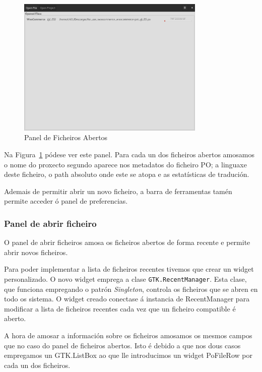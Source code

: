 \begin{figure}[h!]
    \centering
    \includegraphics[width=0.8\textwidth]{img/panel_ficheiros_abertos.png}
    \caption{Panel de Ficheiros Abertos}
    \label{fig:ui:panel:openedfiles}
\end{figure}

Na Figura~\ref{fig:ui:panel:openedfiles} pódese ver este panel. Para cada un dos ficheiros abertos amosamos o nome do proxecto segundo aparece nos metadatos do ficheiro PO; a linguaxe deste ficheiro, o path absoluto onde este se atopa e as estatísticas de tradución.

Ademais de permitir abrir un novo ficheiro, a barra de ferramentas tamén permite acceder ó panel de preferencias.

\subsubsection{Panel de abrir ficheiro}

O panel de abrir ficheiros amosa os ficheiros abertos de forma recente e permite abrir novos ficheiros.

Para poder implementar a lista de ficheiros recentes tivemos que crear un widget personalizado. O novo widget emprega a clase \lstinline{GTK.RecentManager}. Esta clase, que funciona empregando o patrón \emph{Singleton}\cite{book:gang4pat}, controla os ficheiros que se abren en todo os sistema. O widget creado conectase á instancia de RecentManager para modificar a lista de ficheiros recentes cada vez que un ficheiro compatible é aberto.

A hora de amosar a información sobre os ficheiros amosamos os mesmos campos que no caso do panel de ficheiros abertos. Isto é debido a que nos dous casos empregamos un GTK.ListBox ao que lle introducimos un widget PoFileRow por cada un dos ficheiros.

